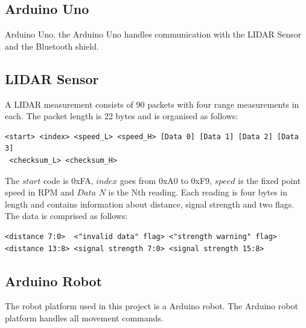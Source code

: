 \subsection{Arduino Uno}
Arduino Uno\cite{ArduinoUno}.
the Arduino Uno handles communication with the LIDAR Sensor and the Bluetooth shield.

\subsection{LIDAR Sensor}
A LIDAR measurement consists of 90 packets with four range measurements in each. The packet length is 22 bytes and is organised as follows\cite{LIDAR}:
\begin{verbatim}
<start> <index> <speed_L> <speed_H> [Data 0] [Data 1] [Data 2] [Data 3]
 <checksum_L> <checksum_H>
\end{verbatim}
The $start$ code is 0xFA, $index$ goes from 0xA0 to 0xF9, $speed$ is the fixed point speed in RPM and $Data$ $N$ is the Nth reading. Each reading is four bytes in length and contains information about distance, signal strength and two flags. The data is comprised as follows:
\begin{verbatim}
<distance 7:0>  <"invalid data" flag> <"strength warning" flag> 
<distance 13:8> <signal strength 7:0> <signal strength 15:8>
\end{verbatim}

\subsection{Arduino Robot}
The robot platform used in this project is a Arduino robot\cite{ArduinoRobot}. The Arduino robot platform handles all movement commands.

 
